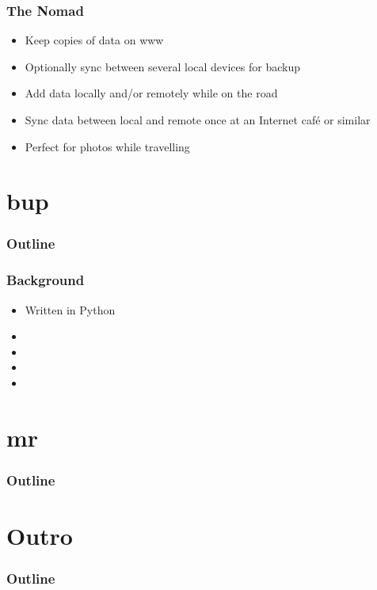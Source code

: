 \documentclass[t]{beamer}
\begin{document}
\begin{frame}
	\frametitle{The Nomad}
	\begin{itemize}
		\item Keep copies of data on www
		\item Optionally sync between several local devices for backup
		\item Add data locally and/or remotely while on the road
		\item Sync data between local and remote once at an Internet café or similar
		\item Perfect for photos while travelling
	\end{itemize}
\end{frame}


\section{bup}

\begin{frame}
	\frametitle{Outline}
	\tableofcontents[currentsection]
\end{frame}


\begin{frame}
	\frametitle{Background}
	\begin{itemize}
		\item Written in Python
		\item 
		\item 
		\item 
		\item 
	\end{itemize}
\end{frame}


\section{mr}

\begin{frame}
	\frametitle{Outline}
	\tableofcontents[currentsection]
\end{frame}



\section{Outro}

\begin{frame}
	\frametitle{Outline}
	\tableofcontents[currentsection]
\end{frame}
\end{document}
